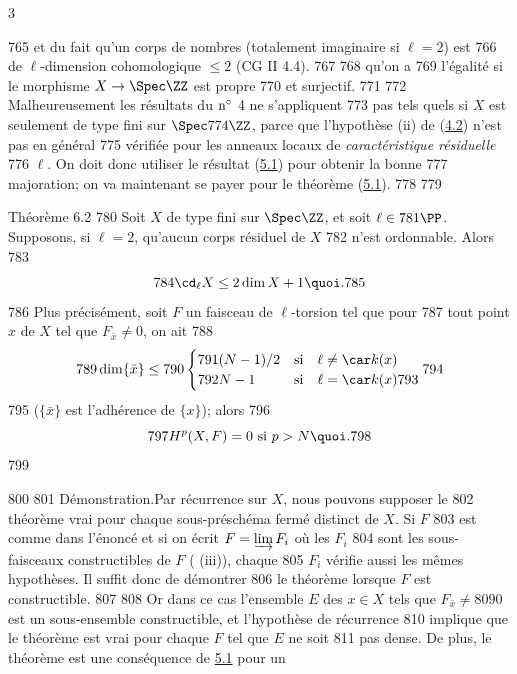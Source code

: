3	\documentclass[10pt]{../fichiers-configuration-latex/smfart}
\begin{document}
   765	et du fait qu'un corps de nombres (totalement imaginaire si $\ell =2$) est
   766	de $\ell$-dimension cohomologique $\leq 2$ (CG II 4.4).
   767	
   768	 qu'on a
   769	l'égalité si le morphisme $X\rightarrow \Spec \ZZ$ est propre
   770	et surjectif.
   771	
   772	Malheureusement les résultats du ${\rm n^{\circ}}$ 4 ne s'appliquent
   773	pas tels quels si $X$ est seulement de type fini sur $\Spec
   774	\ZZ$, parce que l'hypothèse (ii) de (\hyperref[X.cor4.2]{4.2}) n'est pas en général
   775	vérifiée pour les anneaux locaux de \emph{caractéristique résiduelle}
   776	$\ell$. On doit donc utiliser le résultat (\hyperref[X.thm5.1]{5.1}) pour obtenir la bonne
   777	majoration; on va maintenant se payer pour le théorème (\hyperref[X.thm5.1]{5.1}).
   778	
   779	\begin{enonce*}{Théorème 6.2}
   780	Soit $X$ de type fini sur $\Spec \ZZ$, et soit $\ell\in
   781	\PP$. Supposons, si $\ell=2$, qu'aucun corps résiduel de $X$
   782	n'est ordonnable. Alors
   783	$$
   784	\cd_{\ell}X\leq 2\dim X+1{\quoi}.
   785	$$
   786	Plus précisément, soit $F$ un faisceau de $\ell$-torsion tel que pour
   787	tout point $x$ de $X$ tel que $F_{\bar{x}}\neq 0$, on ait
   788	$$
   789	\dim\{\bar{x}\}\leq
   790	\begin{cases}
   791	(N-1)/2 &\mbox{si\quad } \ell\neq \car k(x)\\
   792	N-1     &\mbox{si\quad } \ell=\car k(x)
   793	\end{cases}
   794	$$
   795	($\{\bar{x}\}$ est l'adhérence de $\{x\}$); alors
   796	$$
   797	H^p(X,F)=0\mbox{ si } p>N{\quoi}.
   798	$$
   799	\end{enonce*}
   800	
   801	Démonstration.\pageoriginale Par récurrence sur $X$, nous pouvons supposer le
   802	théorème vrai pour chaque sous-préschéma fermé distinct de $X$. Si $F$
   803	est comme dans l'énoncé et si on écrit $F=\varinjlim F_i$ où les $F_i$
   804	sont les sous-faisceaux constructibles de $F$ ( (iii)), chaque
   805	$F_i$ vérifie aussi les mêmes hypothèses. Il suffit donc de démontrer
   806	le théorème lorsque $F$ est constructible.
   807	
   808	Or dans ce cas l'ensemble $E$ des $x\in X$ tels que $F_{\bar{x}}\neq
   809	0$ est un sous-ensemble constructible, et l'hypothèse de récurrence
   810	implique que le théorème est vrai pour chaque $F$ tel que $E$ ne soit
   811	pas dense. De plus, le théorème est une conséquence de \hyperref[X.thm5.1]{5.1} pour un
\end{document}
